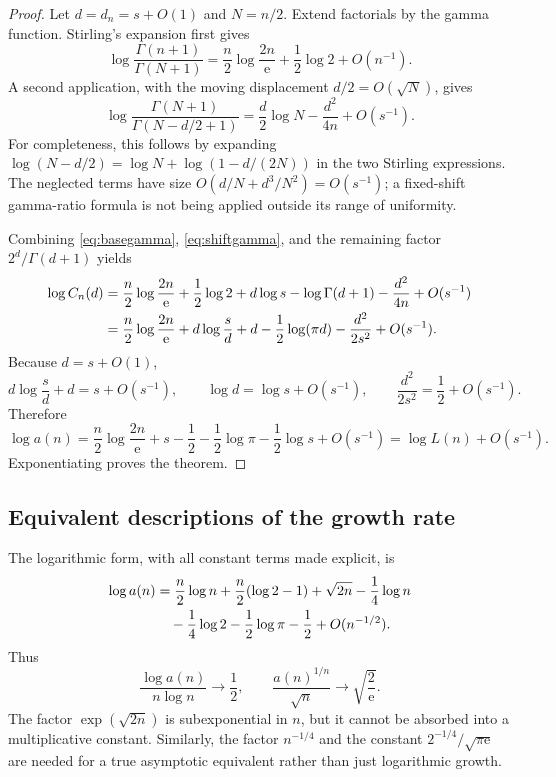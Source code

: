 \documentclass[11pt,letterpaper]{article}
\theoremstyle{remark}
\newcommand{\ee}{\mathrm{e}}
\begin{document}
\begin{proof}
Let $d=d_n=s+O(1)$ and $N=n/2$. Extend factorials by the gamma function.
Stirling's expansion \cite{dlmfgamma} first gives
\begin{equation}\label{eq:basegamma}
 \log\frac{\Gamma(n+1)}{\Gamma(N+1)}
 =\frac n2\log\frac{2n}{\ee}+\frac12\log2+O(n^{-1}).
\end{equation}
A second application, with the moving displacement $d/2=O(\sqrt N)$,
gives
\begin{equation}\label{eq:shiftgamma}
 \log\frac{\Gamma(N+1)}{\Gamma(N-d/2+1)}
 =\frac d2\log N-\frac{d^2}{4n}+O(s^{-1}).
\end{equation}
For completeness, this follows by expanding
$\log(N-d/2)=\log N+\log(1-d/(2N))$ in the two Stirling expressions.
The neglected terms have size
$O(d/N+d^3/N^2)=O(s^{-1})$; a fixed-shift gamma-ratio formula is not
being applied outside its range of uniformity.

Combining \eqref{eq:basegamma}, \eqref{eq:shiftgamma}, and the remaining
factor $2^d/\Gamma(d+1)$ yields
\begin{align}
 \log C_n(d)
 &=\frac n2\log\frac{2n}{\ee}+\frac12\log2
   +d\log s-\log\Gamma(d+1)-\frac{d^2}{4n}
   +O(s^{-1})\notag\\
 &=\frac n2\log\frac{2n}{\ee}
   +d\log\frac{s}{d}+d
   -\frac12\log(\pi d)-\frac{d^2}{2s^2}
   +O(s^{-1}).\label{eq:basiclog}
\end{align}
Because $d=s+O(1)$,
\[
 d\log\frac{s}{d}+d=s+O(s^{-1}),\qquad
 \log d=\log s+O(s^{-1}),\qquad
 \frac{d^2}{2s^2}=\frac12+O(s^{-1}).
\]
Therefore
\begin{equation}\label{eq:logleading}
 \log a(n)=\frac n2\log\frac{2n}{\ee}+s
 -\frac12-\frac12\log\pi-\frac12\log s+O(s^{-1})
 =\log L(n)+O(s^{-1}).
\end{equation}
Exponentiating proves the theorem.
\end{proof}

\subsection{Equivalent descriptions of the growth rate}

The logarithmic form, with all constant terms made explicit, is
\begin{align}
 \log a(n)
 &=\frac n2\log n+\frac n2(\log2-1)+\sqrt{2n}
   -\frac14\log n\notag\\
 &\quad-\frac14\log2-\frac12\log\pi-\frac12
   +O(n^{-1/2}).\label{eq:fulllog}
\end{align}
Thus
\begin{equation}\label{eq:growthlimits}
 \frac{\log a(n)}{n\log n}\longrightarrow\frac12,
 \qquad
 \frac{a(n)^{1/n}}{\sqrt n}\longrightarrow\sqrt{\frac2{\ee}}.
\end{equation}
The factor $\exp(\sqrt{2n})$ is subexponential in $n$, but it cannot be
absorbed into a multiplicative constant. Similarly, the factor $n^{-1/4}$
and the constant $2^{-1/4}/\sqrt{\pi\ee}$ are needed for a true asymptotic
equivalent rather than just logarithmic growth.
\end{document}
